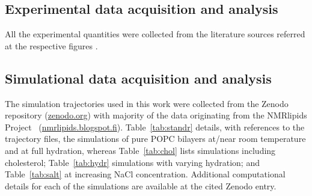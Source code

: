 \documentclass[journal=jpcbfk,manuscript=article,layout=twocolumn]{achemso}
\begin{document}
\begin{comment}
 The dipolar coupling constant $d_{\mathrm{CH}}$ is defined as

\begin{equation}
d_{\mathrm{CH}}=\frac{\hslash\gamma_{\mathrm{H}}\gamma_{\mathrm{C}}\mu_{0}}{4\pi\langle r^{3}_{\mathrm{CH}} \rangle} ,
\end{equation}

where $\hslash$ is the reduced Planck constant, $\gamma_{\mathrm{C}}$ and $\gamma_{\mathrm{H}}$ are the gyromagnetic constants for $^{1}H$ and $^{13}C$, $\mu_{0}$ is the vacuum permeability, and $\langle r^{3}_{\mathrm{CH}}\rangle$ denotes the average cubic length of the C-H bond.
\end{comment}

\subsection{Experimental data acquisition and analysis}
%
All the experimental quantities were collected from the literature  sources referred at the respective figures .   

\subsection{Simulational data acquisition and analysis}
%
The simulation trajectories used in this work were collected from the Zenodo repository (\url{zenodo.org}) with majority of the data originating from the NMRlipids Project~\cite{botan15,catte16} (\url{nmrlipids.blogspot.fi}).
Table~\ref{tab:standr} details, with references to the trajectory files, the simulations of pure POPC bilayers at/near room temperature and at full hydration, whereas
Table~\ref{tab:chol} lists simulations including cholesterol;
Table~\ref{tab:hydr} simulations with varying hydration; and
Table~\ref{tab:salt} at increasing NaCl concentration.
Additional computational details for each of the simulations are available at the cited Zenodo entry.
\end{document}
